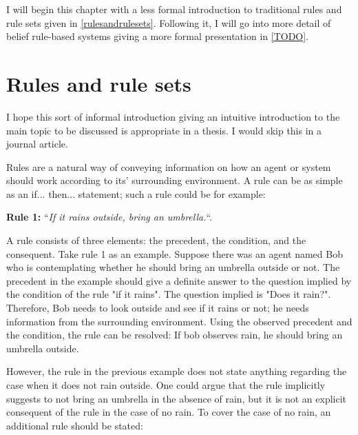 I will begin this chapter with a less formal introduction to traditional rules and rule sets given in \ref{rulesandrulesets}.
Following it, I will go into more detail of belief rule-based systems giving a more formal presentation in \ref{TODO}.

\section{Rules and rule sets}

{\color{red}I hope this sort of informal introduction giving an intuitive introduction to the main topic to be discussed
is appropriate in a thesis. I would skip this in a journal article.}

\label{rulesandrulesets}
Rules are a natural way of conveying information on how an agent or system should work according to its' surrounding environment.
A rule can be as simple as an if... then... statement; such a rule could be for example:

\begin{displayquote}
\textbf{Rule 1:} ``\textit{If it rains outside, bring an umbrella.}``.
\end{displayquote}

A rule consists of three elements: the precedent, the condition, and the consequent. Take rule 1 as an example.
Suppose there was an agent named Bob who is contemplating whether he should bring an umbrella
outside or not. The precedent in the example should give a definite answer to the question implied by the condition of
the rule "if it rains". The question implied is "Does it rain?".
Therefore, Bob needs to look outside and see if it rains or not; he needs information from the surrounding environment.
Using the observed precedent and the condition, the rule can be resolved: If bob observes rain, he 
should bring an umbrella outside.

However, the rule in the previous example does not state anything
regarding the case when it does not rain outside. One could argue that the rule implicitly suggests to not bring an umbrella
in the absence of rain,
but it is not an explicit consequent of the rule in the case of no rain. To cover the case of no rain,
an additional rule should be stated:

